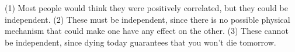 (1) Most people would think they were positively correlated, but they could
be independent. (2) These must be independent, since there is no possible
physical mechanism that could make one have any effect on the other.
(3) These cannot be independent, since dying today guarantees that you
won't die tomorrow.



